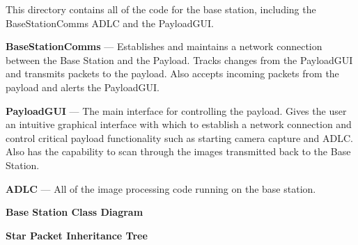 This directory contains all of the code for the base station, including the Base\-Station\-Comms A\-D\-L\-C and the Payload\-G\-U\-I.

{\bfseries Base\-Station\-Comms} --- Establishes and maintains a network connection between the Base Station and the Payload. Tracks changes from the Payload\-G\-U\-I and transmits packets to the payload. Also accepts incoming packets from the payload and alerts the Payload\-G\-U\-I.

{\bfseries Payload\-G\-U\-I} --- The main interface for controlling the payload. Gives the user an intuitive graphical interface with which to establish a network connection and control critical payload functionality such as starting camera capture and A\-D\-L\-C. Also has the capability to scan through the images transmitted back to the Base Station.

{\bfseries A\-D\-L\-C} --- All of the image processing code running on the base station.

{\bfseries Base Station Class Diagram} 

{\bfseries Star Packet Inheritance Tree}

 